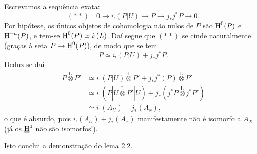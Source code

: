 Escrevamos a sequência exata:
\[
(**) \quad 0 \longrightarrow i_{!}(P|U) \longrightarrow P \longrightarrow j_{*}j^{*}P \longrightarrow 0.
\]
Por hipótese, os únicos objetos de cohomologia não nulos de $P$ são $\underline{\mathrm H}^{0}(P)$ e $\underline{\mathrm H}^{-a}(P)$, e tem-se $\underline{\mathrm H}^{0}(P) \simeq i_{!}(L)$. Daí segue que $(**)$ se cinde naturalmente (graças à seta $P \to \underline{\mathrm H}^{0}(P)$), de modo que se tem
\[
P \simeq i_{!}(P|U) + j_{*}j^{*}P.
\]
Deduz-se daí
\begin{align*}
P \mathop{\otimes}\limits^{\mathrm{L}} P' &\simeq i_{!}(P|U) \mathop{\otimes}\limits^{\mathrm{L}} P' + j_{*}j^{*}(P) \mathop{\otimes}\limits^{\mathrm{L}} P' \\
&\simeq i_{!}(P|U \mathop{\otimes}\limits^{\mathrm{L}} P'|U) + j_{*}(j^{*}P \mathop{\otimes}\limits^{\mathrm{L}} j^{*}P') \\
&\simeq i_{!}(A_U) + j_{*}(A_x),
\end{align*}
o que é absurdo, pois $i_{!}(A_U) + j_{*}(A_x)$ manifestamente não é isomorfo a $A_X$ (já os $\underline{\mathrm H}^{0}$ não são isomorfos!).

Isto conclui a demonstração do lema 2.2.
